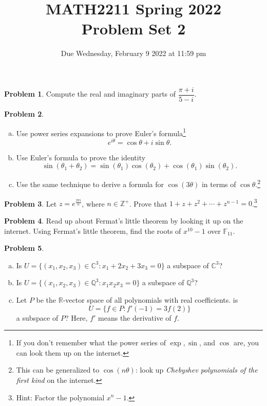 \documentclass[11pt,oneside]{amsart}
\title{MATH2211 Spring 2022\\
Problem Set 2}
\author{Due Wednesday, February 9 2022 at 11:59 pm}
\theoremstyle{definition}
\newtheorem{problem}{Problem}
\newcommand{\bC}{\mathbb{C}}
\newcommand{\bF}{\mathbb{F}}
\newcommand{\bQ}{\mathbb{Q}}
\newcommand{\bR}{\mathbb{R}}
\newcommand{\bZ}{\mathbb{Z}}
\begin{document}
    \maketitle

    \begin{problem}
        Compute the real and imaginary parts of $\dfrac{\pi+i}{5-i}$.
    \end{problem}

    \begin{problem}
        \hfill\begin{enumerate}[(a)]
            \item Use power series expansions to prove Euler's formula\footnote{If you don't remember what the power series of $\exp,\sin$, and $\cos$ are, you can look them up on the internet.}
            \[e^{i\theta}=\cos\theta+i\sin\theta.\]
            \item Use Euler's formula to prove the identity
            \[\sin(\theta_1+\theta_2)=\sin(\theta_1)\cos(\theta_2)+\cos(\theta_1)\sin(\theta_2).\]
            \item Use the same technique to derive a formula for $\cos(3\theta)$ in terms of $\cos\theta$.\footnote{This can be generalized to $\cos(n\theta)$: look up \emph{Chebyshev polynomials of the first kind} on the internet.}
        \end{enumerate}
    \end{problem}

    \begin{problem}
        Let $z=e^{\frac{2\pi i}n}$, where $n\in\bZ^+$. Prove that $1+z+z^2+\cdots+z^{n-1}=0$.\footnote{Hint: Factor the polynomial $x^n-1$.}
    \end{problem}

    \begin{problem}
        Read up about Fermat's little theorem by looking it up on the internet. Using Fermat's little theorem, find the roots of $x^{10}-1$ over $\bF_{11}$.
    \end{problem}

    \begin{problem}
        \hfill\begin{enumerate}[(a)]
            \item Is $U=\{(x_1,x_2,x_3)\in\bC^3:x_1+2x_2+3x_3=0\}$ a subspace of $\bC^3$?
            \item Is $U=\{(x_1,x_2,x_3)\in\bQ^3:x_1x_2x_3=0\}$ a subspace of $\bQ^3$?
            \item Let $P$ be the $\bR$-vector space of all polynomials with real coefficients. is
            \[U=\{f\in P:f'(-1)=3f(2)\}\]
            a subspace of $P$? Here, $f'$ means the derivative of $f$.
        \end{enumerate}
    \end{problem}
\end{document}
